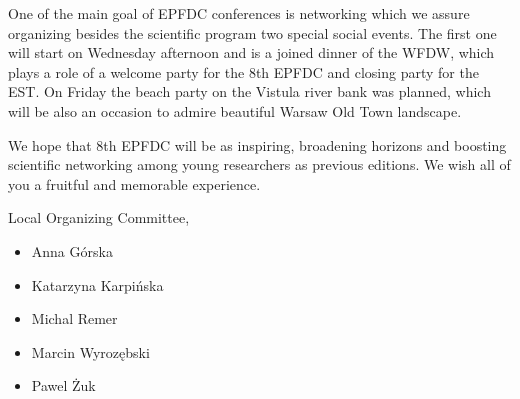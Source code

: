 One of the main goal of EPFDC conferences is networking which we assure organizing besides the scientific program  two special social events. The first one will start on Wednesday afternoon and is a joined dinner of the WFDW, which plays a role of a welcome party for the 8th EPFDC and closing party for the EST. On Friday the beach party on the Vistula river bank was planned, which will be also an occasion to admire beautiful Warsaw Old Town landscape.

We hope that 8th EPFDC will be as inspiring, broadening horizons and boosting scientific networking among young researchers as previous editions. We wish all of you a fruitful and memorable experience.

Local Organizing Committee,\begin{itemize}
	\item Anna Górska 
\item Katarzyna Karpińska
\item Michal Remer 
\item Marcin Wyrozębski
\item Pawel Żuk
\end{itemize}

